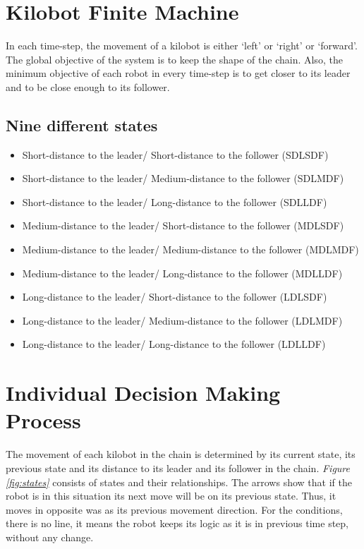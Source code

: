 \documentclass[11pt,a4paper]{article}
\begin{document}
\section {Kilobot Finite Machine }
In each time-step, the movement of a kilobot is either `left' or `right' or `forward'. The global objective of the system is to keep the shape of the chain. Also, the minimum objective of each robot in every time-step is to get closer to its leader and to be close enough to its follower.  
\subsection{Nine different states}
\begin{itemize}
    \item Short-distance to the leader/ Short-distance to the follower (SDLSDF)   
    \item Short-distance to the leader/ Medium-distance to the follower (SDLMDF)
    \item Short-distance to the leader/ Long-distance to the follower (SDLLDF)   
    \item Medium-distance to the leader/ Short-distance to the follower  (MDLSDF) 
    \item Medium-distance to the leader/ Medium-distance to the follower  (MDLMDF) 
    \item Medium-distance to the leader/ Long-distance to the follower (MDLLDF) 
    \item Long-distance to the leader/ Short-distance to the follower (LDLSDF) 
    \item Long-distance to the leader/ Medium-distance to the follower (LDLMDF) 
    \item Long-distance to the leader/ Long-distance to the follower (LDLLDF) 
\end{itemize}
 \section{Individual Decision Making Process }
 The movement of each kilobot in the chain is determined by its current state, its previous state and its distance to its leader and its follower in the chain. \textit{Figure \ref{fig:states}} consists of states and their relationships. The arrows show that if the robot is in this situation its next move will be on its previous state. Thus, it moves in opposite was as its previous movement direction. For the conditions, there is no line, it means the robot keeps its logic as it is in previous time step, without any change. 
 
\end{document}
